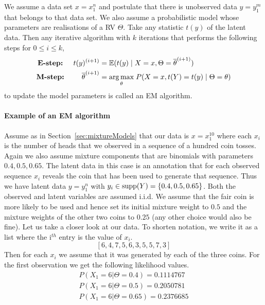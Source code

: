 \begin{Definition}[EM algorithm]\label{def:EM}
We assume a data set $ x = x_{1}^{n} $ and postulate that there is unobserved data $ y = y_{1}^{m} $ that belongs to that data set. We also
assume a probabilistic model whose parameters are realisations of a RV $ \Theta $. Take any
statistic $ t(y) $ of the latent data. Then any iterative algorithm with $ k $ iterations that performs the following steps for $0\leq i \leq k$,
\begin{align*}
\mbox{\textbf{E-step:} } \quad t(y)^{(i+1)} &= \mathbb{E}(t(y) \mid X = x, \Theta = \overline{\theta}^{(i+1)}) \\
\mbox{\textbf{M-step:} } \qquad \overline{\theta}^{(i+1)} &= \underset{\theta}{\arg\max} \; P(X=x, t(Y) = t(y) \mid \Theta = \theta) 
\end{align*}
to update the model parameters is called an EM algorithm.
\end{Definition}

\paragraph{Example of an EM algorithm} Assume as in Section~\ref{sec:mixtureModels} that our data is $ x=x^{10}_{1} $ where each $ x_{i} $ is the 
number of heads that we observed in a sequence of a hundred coin tosses. Again we also assume mixture components that are binomials with parameters
$ 0.4, 0.5, 0.65 $. The latent data in this case is an annotation that for each observed sequence $ x_{i} $ reveals the coin that has been used
to generate that sequence. Thus we have latent data $ y=y_{1}^{n} $ with $ y_i \in \operatorname{supp}(Y) = \{0.4,0.5,0.65\} $. Both the observed and latent variables
are assumed i.i.d.
We assume that the fair coin is more likely to be used and hence set its initial mixture weight to $ 0.5 $ and the mixture weights of the 
other two coins to $ 0.25 $ (any other choice would also be fine). Let 
us take a closer look at our data. To shorten notation, we write it as a list where the i$ ^{th} $ entry is the value of $ x_{i} $.
$$ [6, 4, 7, 5, 6, 3, 5, 5, 7, 3] $$ 
Then for each $ x_{i} $ we assume that it was generated by each of the three coins. For the first observation we get the following likelihood values.
\begin{align}
&P(X_{1}=6|\Theta=0.4) = 0.1114767& \\
&P(X_{1}=6|\Theta=0.5) = 0.2050781& \nonumber \\ 
&P(X_{1}=6|\Theta=0.65) = 0.2376685& \nonumber
\end{align}

